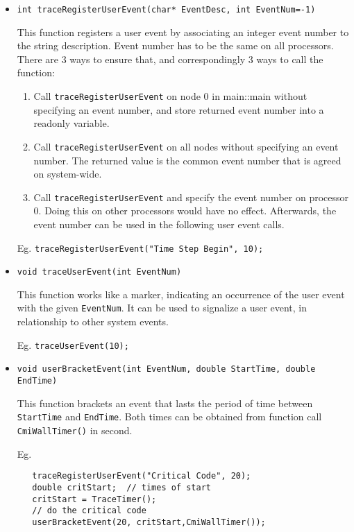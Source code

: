 \documentclass[10pt,dvips]{article}
\begin{document}
\begin{itemize}
\item
{\tt int traceRegisterUserEvent(char* EventDesc, int EventNum=-1) }

This function registers a user event by associating an integer event number to
the string description. Event number has to be the same on all processors. There
are 3 ways to ensure that, and correspondingly 3 ways to call the function:

\begin{enumerate}
\item
Call {\tt traceRegisterUserEvent} on node 0 in main::main without specifying
an event number, and store returned event number into a readonly variable.
\item
Call {\tt traceRegisterUserEvent} on all nodes without specifying an event
number. The returned value is the common event number that is agreed on system-wide.
\item
Call {\tt traceRegisterUserEvent} and specify the event number on processor 0.
Doing this on other processors would have no effect. Afterwards, the event number
can be used in the following user event calls.
\end{enumerate}

Eg. {\tt traceRegisterUserEvent("Time Step Begin", 10);}

\item
{\tt void traceUserEvent(int EventNum) }

This function works like a marker, indicating an occurrence of the user event
with the given {\tt EventNum}. It can be used to signalize a user event, in
relationship to other system events.

Eg. {\tt traceUserEvent(10);}

\item
{\tt void userBracketEvent(int EventNum, double StartTime, double EndTime) }

This function brackets an event that lasts the period of time between
{\tt StartTime} and {\tt EndTime}. Both times can be obtained from function call
{\tt CmiWallTimer()} in second.

Eg.
\begin{verbatim}
   traceRegisterUserEvent("Critical Code", 20);
   double critStart;  // times of start
   critStart = TraceTimer();
   // do the critical code
   userBracketEvent(20, critStart,CmiWallTimer());
\end{verbatim}

\end{itemize}
\end{document}
